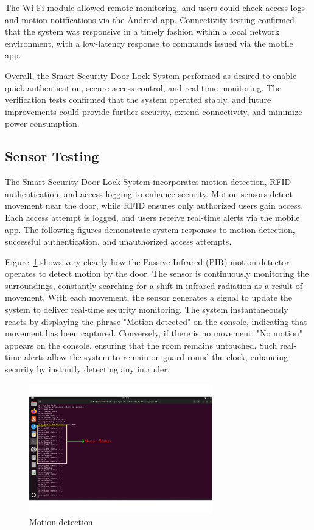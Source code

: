 \documentclass[a4paper]{scrartcl}
\begin{document}
The Wi-Fi module allowed remote monitoring, and users could check access logs and motion notifications via the Android app. Connectivity testing confirmed that the system was responsive in a timely fashion within a local network environment, with a low-latency response to commands issued via the mobile app.

Overall, the Smart Security Door Lock System performed as desired to enable quick authentication, secure access control, and real-time monitoring. The verification tests confirmed that the system operated stably, and future improvements could provide further security, extend connectivity, and minimize power consumption.


\subsection{Sensor Testing}

The Smart Security Door Lock System incorporates motion detection, RFID authentication, and access logging to enhance security. Motion sensors detect movement near the door, while RFID ensures only authorized users gain access. Each access attempt is logged, and users receive real-time alerts via the mobile app. The following figures demonstrate system responses to motion detection, successful authentication, and unauthorized access attempts.


Figure~\ref{fig:detection} shows very clearly how the Passive Infrared (PIR) motion detector operates to detect motion by the door. The sensor is continuously monitoring the surroundings, constantly searching for a shift in infrared radiation as a result of movement. With each movement, the sensor generates a signal to update the system to deliver real-time security monitoring. The system instantaneously reacts by displaying the phrase "Motion detected" on the console, indicating that movement has been captured. Conversely, if there is no movement, "No motion" appears on the console, ensuring that the room remains untouched. Such real-time alerts allow the system to remain on guard round the clock, enhancing security by instantly detecting any intruder.
\begin{figure}[H]
    \centering
    \includegraphics[width=0.71\textwidth]{motiondetection.pdf}
    \caption{Motion detection}
    \label{fig:detection}
\end{figure}
\end{document}
